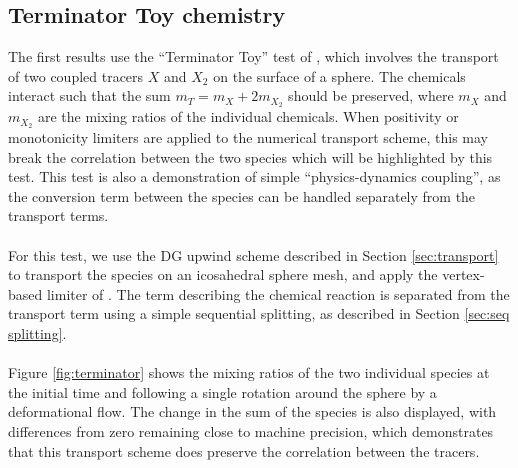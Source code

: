 \documentclass[journal abbreviation, manuscript]{copernicus}
\begin{document}
\subsection{Terminator Toy chemistry}
The first results use the ``Terminator Toy'' test of \citet{lauritzen2015terminator}, which involves the transport of two coupled tracers $X$ and $X_2$ on the surface of a sphere.
The chemicals interact such that the sum $m_T=m_X+2m_{X_2}$ should be preserved, where $m_X$ and $m_{X_2}$ are the mixing ratios of the individual chemicals.
When positivity or monotonicity limiters are applied to the numerical transport scheme, this may break the correlation between the two species which will be highlighted by this test.
This test is also a demonstration of simple ``physics-dynamics coupling'', as the conversion term between the species can be handled separately from the transport terms. \\
\\
For this test, we use the DG upwind scheme described in Section \ref{sec:transport} to transport the species on an icosahedral sphere mesh, and apply the vertex-based limiter of \citet{kuzmin2010vertex}.
The term describing the chemical reaction is separated from the transport term using a simple sequential splitting, as described in Section \ref{sec:seq splitting}. \\
\\
Figure \ref{fig:terminator} shows the mixing ratios of the two individual species at the initial time and following a single rotation around the sphere by a deformational flow.
The change in the sum of the species is also displayed, with differences from zero remaining close to machine precision, which demonstrates that this transport scheme does preserve the correlation between the tracers. 
\end{document}
